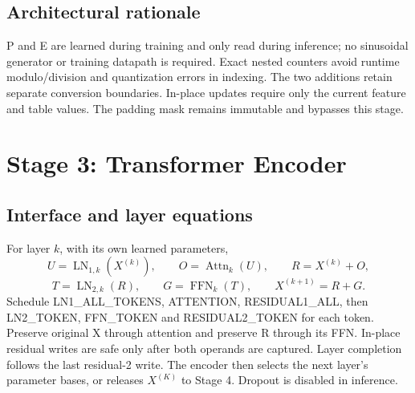 \documentclass[11pt,a4paper]{article}
\begin{document}
\subsection{Architectural rationale}
P and E are learned during training and only read during inference; no sinusoidal generator or training datapath is required. Exact nested counters avoid runtime modulo/division and quantization errors in indexing. The two additions retain separate conversion boundaries. In-place updates require only the current feature and table values. The padding mask remains immutable and bypasses this stage.

\section{Stage 3: Transformer Encoder}
\subsection{Interface and layer equations}
For layer $k$, with its own learned parameters,
\[
U=\operatorname{LN}_{1,k}(X^{(k)}),\qquad O=\operatorname{Attn}_{k}(U),\qquad R=X^{(k)}+O,
\]
\[
T=\operatorname{LN}_{2,k}(R),\qquad G=\operatorname{FFN}_{k}(T),\qquad X^{(k+1)}=R+G.
\]
Schedule LN1\_ALL\_TOKENS, ATTENTION, RESIDUAL1\_ALL, then LN2\_TOKEN, FFN\_TOKEN and RESIDUAL2\_TOKEN for each token. Preserve original X through attention and preserve R through its FFN. In-place residual writes are safe only after both operands are captured. Layer completion follows the last residual-2 write. The encoder then selects the next layer's parameter bases, or releases $X^{(K)}$ to Stage 4. Dropout is disabled in inference.

\begin{center}
\end{center}
\end{document}
